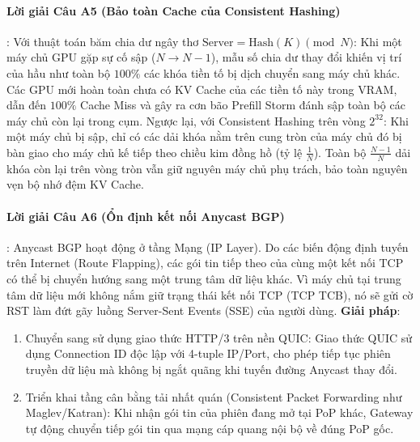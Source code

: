 \paragraph{Lời giải Câu A5 (Bảo toàn Cache của Consistent Hashing)}:
Với thuật toán băm chia dư ngây thơ $\text{Server} = \text{Hash}(K) \pmod N$: Khi một máy chủ GPU gặp sự cố sập ($N \to N-1$), mẫu số chia dư thay đổi khiến vị trí của hầu như toàn bộ $100\%$ các khóa tiền tố bị dịch chuyển sang máy chủ khác. Các GPU mới hoàn toàn chưa có KV Cache của các tiền tố này trong VRAM, dẫn đến $100\%$ Cache Miss và gây ra cơn bão Prefill Storm đánh sập toàn bộ các máy chủ còn lại trong cụm.
Ngược lại, với Consistent Hashing trên vòng $2^{32}$: Khi một máy chủ bị sập, chỉ có các dải khóa nằm trên cung tròn của máy chủ đó bị bàn giao cho máy chủ kế tiếp theo chiều kim đồng hồ (tỷ lệ $\frac{1}{N}$). Toàn bộ $\frac{N-1}{N}$ dải khóa còn lại trên vòng tròn vẫn giữ nguyên máy chủ phụ trách, bảo toàn nguyên vẹn bộ nhớ đệm KV Cache.

\paragraph{Lời giải Câu A6 (Ổn định kết nối Anycast BGP)}:
Anycast BGP hoạt động ở tầng Mạng (IP Layer). Do các biến động định tuyến trên Internet (Route Flapping), các gói tin tiếp theo của cùng một kết nối TCP có thể bị chuyển hướng sang một trung tâm dữ liệu khác. Vì máy chủ tại trung tâm dữ liệu mới không nắm giữ trạng thái kết nối TCP (TCP TCB), nó sẽ gửi cờ RST làm đứt gãy luồng Server-Sent Events (SSE) của người dùng.
\textbf{Giải pháp}:
\begin{enumerate}
  \item Chuyển sang sử dụng giao thức HTTP/3 trên nền QUIC: Giao thức QUIC sử dụng Connection ID độc lập với 4-tuple IP/Port, cho phép tiếp tục phiên truyền dữ liệu mà không bị ngắt quãng khi tuyến đường Anycast thay đổi.
  \item Triển khai tầng cân bằng tải nhất quán (Consistent Packet Forwarding như Maglev/Katran): Khi nhận gói tin của phiên đang mở tại PoP khác, Gateway tự động chuyển tiếp gói tin qua mạng cáp quang nội bộ về đúng PoP gốc.
\end{enumerate}

